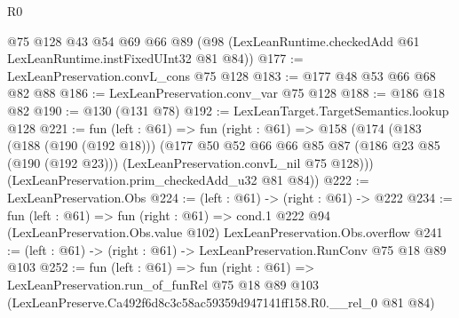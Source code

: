 \begin{lexlean}{R0}
\begin{coremodule}
    @75
    @128
    @43
    @54
    @69
    @66
    @89
    (@98 (LexLeanRuntime.checkedAdd @61 LexLeanRuntime.instFixedUInt32 @81 @84))
@177 := LexLeanPreservation.convL_cons @75 @128
@183 := @177 @48 @53 @66 @68 @82 @88
@186 := LexLeanPreservation.conv_var @75 @128
@188 := @186 @18 @82
@190 := @130 (@131 @78)
@192 := LexLeanTarget.TargetSemantics.lookup @128
@221 := fun (left : @61) =>
  fun (right : @61) =>
  @158
    (@174
      (@183
        (@188 (@190 (@192 @18)))
        (@177
          @50
          @52
          @66
          @66
          @85
          @87
          (@186 @23 @85 (@190 (@192 @23)))
          (LexLeanPreservation.convL_nil @75 @128)))
      (LexLeanPreservation.prim_checkedAdd_u32 @81 @84))
@222 := LexLeanPreservation.Obs
@224 := (left : @61) -> (right : @61) -> @222
@234 := fun (left : @61) =>
  fun (right : @61) =>
  cond.{1} @222 @94 (LexLeanPreservation.Obs.value @102) LexLeanPreservation.Obs.overflow
@241 := (left : @61) -> (right : @61) -> LexLeanPreservation.RunConv @75 @18 @89 @103
@252 := fun (left : @61) =>
  fun (right : @61) =>
  LexLeanPreservation.run_of_funRel
    @75
    @18
    @89
    @103
    (LexLeanPreserve.Ca492f6d8c3c58ac59359d947141ff158.R0.__rel_0 @81 @84)
\end{coremodule}
\end{lexlean}
